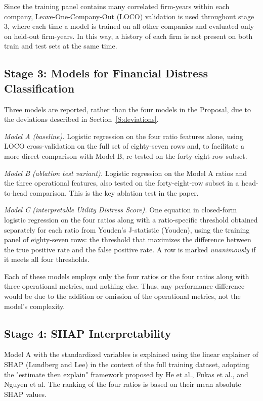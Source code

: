 \documentclass[final,1p,times]{elsarticle}
\begin{document}
Since the training panel contains many correlated firm-years within each company, Leave-One-Company-Out (LOCO) validation is used throughout stage 3, where each time a model is trained on all other companies and evaluated only on held-out firm-years. In this way, a history of each firm is not present on both train and test sets at the same time.

\subsection{Stage 3: Models for Financial Distress Classification}

Three models are reported, rather than the four models in the Proposal, due to the deviations described in Section~\ref{S:deviations}.

\emph{Model A (baseline).} Logistic regression on the four ratio features alone, using LOCO cross-validation on the full set of eighty-seven rows and, to facilitate a more direct comparison with Model B, re-tested on the forty-eight-row subset.

\emph{Model B (ablation test variant).} Logistic regression on the Model A ratios and the three operational features, also tested on the forty-eight-row subset in a head-to-head comparison. This is the key ablation test in the paper.

\emph{Model C (interpretable Utility Distress Score).} One equation in closed-form logistic regression on the four ratios along with a ratio-specific threshold obtained separately for each ratio from Youden's J-statistic (Youden), using the training panel of eighty-seven rows: the threshold that maximizes the difference between the true positive rate and the false positive rate. A row is marked \emph{unanimously} if it meets all four thresholds.

Each of these models employs only the four ratios or the four ratios along with three operational metrics, and nothing else. Thus, any performance difference would be due to the addition or omission of the operational metrics, not the model’s complexity.

\subsection{Stage 4: SHAP Interpretability}

Model A with the standardized variables is explained using the linear explainer of SHAP (Lundberg and Lee) in the context of the full training dataset, adopting the "estimate then explain" framework proposed by He et al., Fukas et al., and Nguyen et al. The ranking of the four ratios is based on their mean absolute SHAP values.
\end{document}
